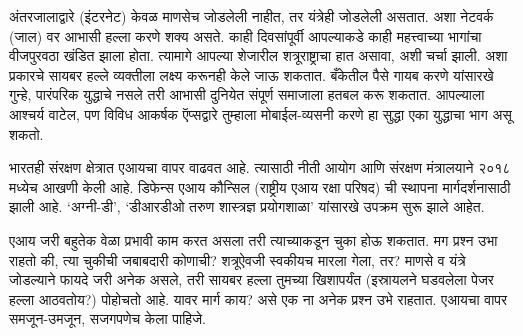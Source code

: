 अंतरजालाद्वारे (इंटरनेट) केवळ माणसेच जोडलेली नाहीत, तर यंत्रेही जोडलेली असतात. अशा नेटवर्क (जाल) वर आभासी हल्ला करणे शक्य असते. काही दिवसांपूर्वी आपल्याकडे काही महत्त्वाच्या भागांचा वीजपुरवठा खंडित झाला होता. त्यामागे आपल्या शेजारील शत्रूराष्ट्राचा हात असावा, अशी चर्चा झाली. अशा प्रकारचे सायबर हल्ले व्यक्तीला लक्ष्य करूनही केले जाऊ शकतात. बँकेतील पैसे गायब करणे यांसारखे गुन्हे, पारंपरिक युद्धाचे नसले तरी आभासी दुनियेत संपूर्ण समाजाला हतबल करू शकतात. आपल्याला आश्चर्य वाटेल, पण विविध आकर्षक ऍप्सद्वारे तुम्हाला मोबाईल-व्यसनी करणे हा सुद्धा एका युद्धाचा भाग असू शकतो.

भारतही संरक्षण क्षेत्रात एआयचा वापर वाढवत आहे. त्यासाठी नीती आयोग आणि संरक्षण मंत्रालयाने २०१८ मध्येच आखणी केली आहे.  डिफेन्स एआय कौन्सिल (राष्ट्रीय एआय रक्षा परिषद) ची स्थापना मार्गदर्शनासाठी झाली आहे. `अग्नी-डी', `डीआरडीओ तरुण शास्त्रज्ञ प्रयोगशाळा' यांसारखे उपक्रम सुरू झाले आहेत.

एआय जरी बहुतेक वेळा प्रभावी काम करत असला तरी त्याच्याकडून चुका होऊ शकतात. मग प्रश्न उभा राहतो की, त्या चुकीची जबाबदारी कोणाची? शत्रूऐवजी स्वकीयच मारला गेला, तर? माणसे व यंत्रे जोडल्याने फायदे जरी अनेक असले, तरी सायबर हल्ला तुमच्या खिशापर्यंत (इस्रायलने घडवलेला पेजर हल्ला आठवतोय?) पोहोचतो आहे. यावर मार्ग काय? असे एक ना अनेक प्रश्न उभे राहतात. एआयचा वापर समजून-उमजून, सजगपणेच केला पाहिजे.